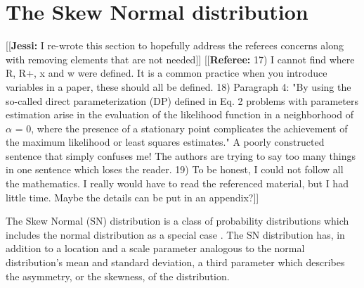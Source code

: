 \documentclass[11pt, oneside]{article}
\newcommand{\jessi}[1]{{\color{Purple}[[\textbf{Jessi: }#1]]}}
\newcommand{\comment}[1]{{\color{red}[[\textbf{Referee: }#1]]}}
\begin{document}
\section{The Skew Normal distribution} \label{sec:2}
\jessi{I re-wrote this section to hopefully address the referees concerns along with removing elements that are not needed}
\comment{17) I cannot find where R, R+, x and w were defined. It is a common practice when you introduce variables in a paper, these should all be defined.
18) Paragraph 4: "By using the so-called direct parameterization (DP) defined in Eq. 2 problems with parameters estimation arise in the evaluation of the likelihood function in a neighborhood of $\alpha$ = 0, where the presence of a stationary point complicates the achievement of the maximum likelihood or least squares estimates."
A poorly constructed sentence that simply confuses me! The authors are trying to say too many things in one sentence which loses the reader.
19) To be honest, I could not follow all the mathematics. I really would have to read the referenced material, but I had little time. Maybe the details can be put in an appendix?}


The Skew Normal (SN) distribution is a class of probability distributions which includes the normal distribution as a special case \citep{Azzalini1985}. The SN distribution has, in addition to a location and a scale parameter analogous to the normal distribution's mean and standard deviation, a third parameter which describes the asymmetry, or the skewness, of the distribution.  
\end{document}
